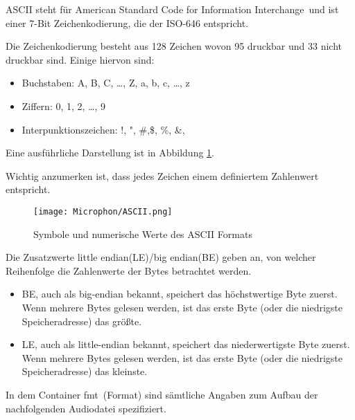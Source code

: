 \label{ascii}ASCII steht für \glqq American Standard Code for Information Interchange\grqq~und ist einer 7-Bit Zeichenkodierung, die der ISO-646 entspricht.

Die Zeichenkodierung besteht aus 128 Zeichen wovon 95 druckbar und 33 nicht druckbar sind. 
Einige hiervon sind:
\begin{itemize}
    \item Buchstaben: A, B, C, …, Z, a, b, c, …, z
    \item Ziffern: 0, 1, 2, …, 9
    \item Interpunktionszeichen: !, ", \#,\$, \%, \&, 
\end{itemize}
Eine ausführliche Darstellung ist in Abbildung \ref{fig:ASCII}.

Wichtig anzumerken ist, dass jedes Zeichen einem definiertem Zahlenwert entspricht.



\begin{figure}[ht]
    \centering
    \texttt{[image: Microphon/ASCII.png]}
    \caption{Symbole und numerische Werte des ASCII Formats}
    \label{fig:ASCII}
\end{figure}



Die Zusatzwerte little endian(LE)/big endian(BE) geben an, von welcher Reihenfolge die Zahlenwerte der Bytes betrachtet 
werden.

\begin{itemize}
    \item BE, auch als big-endian bekannt, speichert das höchstwertige Byte zuerst. Wenn mehrere Bytes gelesen werden, 
    ist das erste Byte (oder die niedrigste Speicheradresse) das größte. 
    \item LE, auch als little-endian bekannt, speichert das niederwertigste Byte zuerst. Wenn mehrere Bytes gelesen werden, 
    ist das erste Byte (oder die niedrigste Speicheradresse) das kleinste.
\end{itemize}

In dem Container \grqq fmt\grqq \ (Format)  sind sämtliche Angaben zum Aufbau der nachfolgenden Audiodatei spezifiziert.

